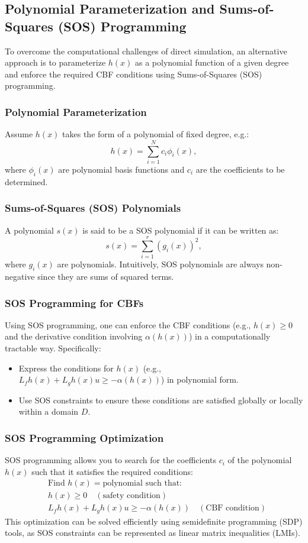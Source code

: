 \documentclass[12pt]{article}
\begin{document}
\subsection{Polynomial Parameterization and Sums-of-Squares (SOS) Programming}
To overcome the computational challenges of direct simulation, an alternative approach is to parameterize \( h(x) \) as a polynomial function of a given degree and enforce the required CBF conditions using Sums-of-Squares (SOS) programming.

\subsubsection{Polynomial Parameterization}
Assume \( h(x) \) takes the form of a polynomial of fixed degree, e.g.:
\[
h(x) = \sum_{i=1}^N c_i \phi_i(x),
\]
where \( \phi_i(x) \) are polynomial basis functions and \( c_i \) are the coefficients to be determined.

\subsubsection{Sums-of-Squares (SOS) Polynomials}
A polynomial \( s(x) \) is said to be a SOS polynomial if it can be written as:
\[
s(x) = \sum_{i=1}^r (g_i(x))^2,
\]
where \( g_i(x) \) are polynomials. Intuitively, SOS polynomials are always non-negative since they are sums of squared terms.

\subsubsection{SOS Programming for CBFs}
Using SOS programming, one can enforce the CBF conditions (e.g., \( h(x) \geq 0 \) and the derivative condition involving \( \alpha(h(x)) \)) in a computationally tractable way. Specifically:
\begin{itemize}
    \item Express the conditions for \( h(x) \) (e.g., \( L_f h(x) + L_g h(x) u \geq -\alpha(h(x)) \)) in polynomial form.
    \item Use SOS constraints to ensure these conditions are satisfied globally or locally within a domain \( D \).
\end{itemize}

\subsubsection{SOS Programming Optimization}
SOS programming allows you to search for the coefficients \( c_i \) of the polynomial \( h(x) \) such that it satisfies the required conditions:
\[
\begin{aligned}
& \text{Find } h(x) = \text{polynomial such that:} \\
& h(x) \geq 0 \quad (\text{safety condition}) \\
& L_f h(x) + L_g h(x) u \geq -\alpha(h(x)) \quad (\text{CBF condition})
\end{aligned}
\]
This optimization can be solved efficiently using semidefinite programming (SDP) tools, as SOS constraints can be represented as linear matrix inequalities (LMIs).
\end{document}
